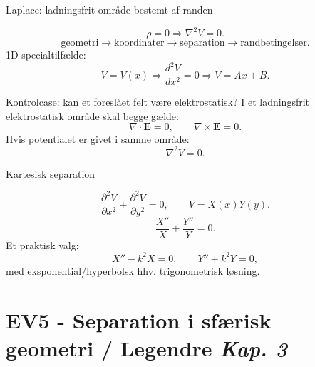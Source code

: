 \documentclass[10pt,a4paper]{article}
\newcommand{\chaptertag}[1]{\hfill{\footnotesize\color{black!50}\textit{#1}}}
\begin{document}
\begin{casebox}{Laplace: ladningsfrit område bestemt af randen}
\begin{minipage}[c]{0.42\linewidth}\centering
{}
\end{minipage}\hfill
\begin{minipage}[c]{0.54\linewidth}
\[
 \boxed{\rho=0\Rightarrow\nabla^2V=0}.
\]
\[
 \boxed{\text{geometri}\to\text{koordinater}\to\text{separation}\to\text{randbetingelser}}.
\]
1D-specialtilfælde:
\[
 V=V(x)\Rightarrow \frac{d^2V}{dx^2}=0\Rightarrow \boxed{V=Ax+B}.
\]
\end{minipage}
\end{casebox}

\begin{casebox}{Kontrolcase: kan et foreslået felt være elektrostatisk?}
I et ladningsfrit elektrostatisk område skal begge gælde:
\[
 \boxed{\nabla\cdot\mathbf E=0},\qquad \boxed{\nabla\times\mathbf E=0}.
\]
Hvis potentialet er givet i samme område:
\[
 \boxed{\nabla^2V=0}.
\]
\end{casebox}

\begin{casebox}{Kartesisk separation}
\begin{minipage}[c]{0.44\linewidth}\centering
{}
\end{minipage}\hfill
\begin{minipage}[c]{0.52\linewidth}
\[
 \frac{\partial^2V}{\partial x^2}+\frac{\partial^2V}{\partial y^2}=0,\qquad V=X(x)Y(y).
\]
\[
 \frac{X''}{X}+\frac{Y''}{Y}=0.
\]
Et praktisk valg:
\[
 X''-k^2X=0,\qquad Y''+k^2Y=0,
\]
med eksponential/hyperbolsk hhv. trigonometrisk løsning.
\end{minipage}
\end{casebox}

\newpage
\section*{EV5 - Separation i sfærisk geometri / Legendre \chaptertag{Kap. 3}}
\end{document}
